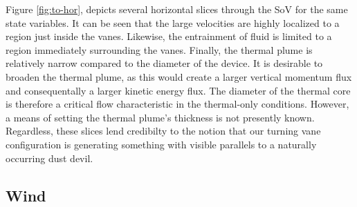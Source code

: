 

Figure \ref{fig:to-hor}, depicts several horizontal slices
through the SoV for the same state variables. It can be seen that the
large velocities are highly localized to a region just inside the
vanes. Likewise, the entrainment of fluid is limited to a region
immediately surrounding the vanes. 
%
%
Finally, the thermal plume is relatively
narrow compared to the diameter of the device. It is desirable to
broaden the thermal plume, as this would create a larger vertical
momentum flux and consequentally a larger kinetic energy flux. 
The diameter of the thermal core is therefore a critical flow
characteristic in the thermal-only conditions. However, a means of
setting the thermal plume's thickness is not presently 
known. Regardless, these slices lend credibilty to the 
notion that our turning vane configuration is generating something with
visible parallels to a naturally occurring dust devil.   

\subsection{Wind}

